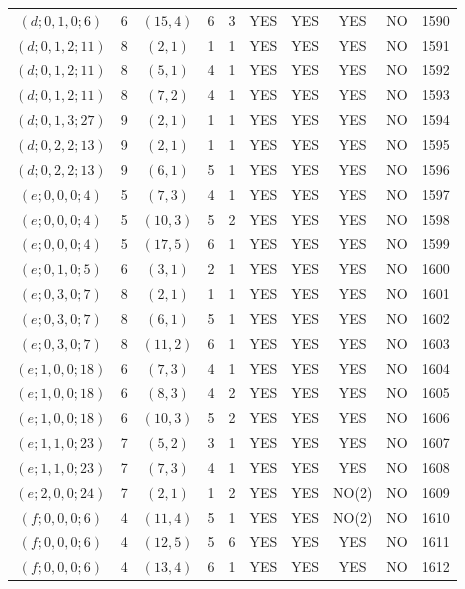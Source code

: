 \begin{longtable}{|c|c|c|c|c|c|c|c|c|c|}
$(d; 0, 1, 0; 6)$ & 6 & $(15, 4)$ & 6 & 3 & YES & YES & YES & NO & 1590\\
$(d; 0, 1, 2; 11)$ & 8 & $(2, 1)$ & 1 & 1 & YES & YES & YES & NO & 1591\\
$(d; 0, 1, 2; 11)$ & 8 & $(5, 1)$ & 4 & 1 & YES & YES & YES & NO & 1592\\
$(d; 0, 1, 2; 11)$ & 8 & $(7, 2)$ & 4 & 1 & YES & YES & YES & NO & 1593\\
$(d; 0, 1, 3; 27)$ & 9 & $(2, 1)$ & 1 & 1 & YES & YES & YES & NO & 1594\\
$(d; 0, 2, 2; 13)$ & 9 & $(2, 1)$ & 1 & 1 & YES & YES & YES & NO & 1595\\
$(d; 0, 2, 2; 13)$ & 9 & $(6, 1)$ & 5 & 1 & YES & YES & YES & NO & 1596\\
$(e; 0, 0, 0; 4)$ & 5 & $(7, 3)$ & 4 & 1 & YES & YES & YES & NO & 1597\\
$(e; 0, 0, 0; 4)$ & 5 & $(10, 3)$ & 5 & 2 & YES & YES & YES & NO & 1598\\
$(e; 0, 0, 0; 4)$ & 5 & $(17, 5)$ & 6 & 1 & YES & YES & YES & NO & 1599\\
$(e; 0, 1, 0; 5)$ & 6 & $(3, 1)$ & 2 & 1 & YES & YES & YES & NO & 1600\\
$(e; 0, 3, 0; 7)$ & 8 & $(2, 1)$ & 1 & 1 & YES & YES & YES & NO & 1601\\
$(e; 0, 3, 0; 7)$ & 8 & $(6, 1)$ & 5 & 1 & YES & YES & YES & NO & 1602\\
$(e; 0, 3, 0; 7)$ & 8 & $(11, 2)$ & 6 & 1 & YES & YES & YES & NO & 1603\\
$(e; 1, 0, 0; 18)$ & 6 & $(7, 3)$ & 4 & 1 & YES & YES & YES & NO & 1604\\
$(e; 1, 0, 0; 18)$ & 6 & $(8, 3)$ & 4 & 2 & YES & YES & YES & NO & 1605\\
$(e; 1, 0, 0; 18)$ & 6 & $(10, 3)$ & 5 & 2 & YES & YES & YES & NO & 1606\\
$(e; 1, 1, 0; 23)$ & 7 & $(5, 2)$ & 3 & 1 & YES & YES & YES & NO & 1607\\
$(e; 1, 1, 0; 23)$ & 7 & $(7, 3)$ & 4 & 1 & YES & YES & YES & NO & 1608\\
$(e; 2, 0, 0; 24)$ & 7 & $(2, 1)$ & 1 & 2 & YES & YES & NO(2) & NO & 1609\\
$(f; 0, 0, 0; 6)$ & 4 & $(11, 4)$ & 5 & 1 & YES & YES & NO(2) & NO & 1610\\
$(f; 0, 0, 0; 6)$ & 4 & $(12, 5)$ & 5 & 6 & YES & YES & YES & NO & 1611\\
$(f; 0, 0, 0; 6)$ & 4 & $(13, 4)$ & 6 & 1 & YES & YES & YES & NO & 1612\\

\end{longtable}
